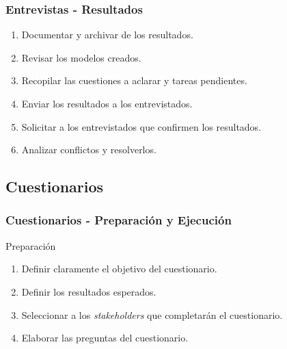 \documentclass[a4paper,t,xcolor=pst,dvips]{beamer}
\begin{document}
\begin{frame}[c]
    \frametitle{Entrevistas - Resultados}
    \begin{enumerate}[<+->]
        \item Documentar y archivar  de los resultados.
        \item Revisar los modelos creados.
        \item Recopilar las cuestiones a aclarar y tareas pendientes.
        \item Enviar los resultados a los entrevistados.
        \item Solicitar a los entrevistados que confirmen los resultados.
        \item Analizar conflictos y resolverlos.
    \end{enumerate}
\end{frame}

\subsection{Cuestionarios}

\begin{frame}[c]
	\frametitle{Cuestionarios - Preparación y Ejecución}
	\begin{block}{Preparación}
		\begin{enumerate}
			\item<1-> Definir claramente el objetivo del cuestionario.
			\item<2-> Definir los resultados esperados.
			\item<3-> Seleccionar a los \emph{stakeholders} que completarán el cuestionario.
			\item<4-> Elaborar las preguntas del cuestionario.
		\end{enumerate}
	\end{block}
\end{frame}
\end{document}
